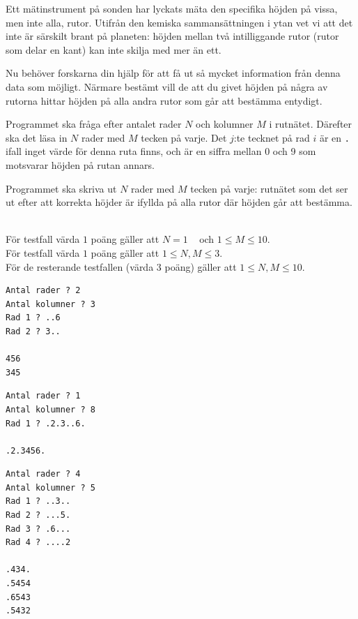 Ett mätinstrument på sonden har lyckats mäta den specifika höjden
på vissa, men inte alla, rutor. Utifrån den kemiska sammansättningen i ytan vet vi att det inte 
är särskilt brant på planeten: höjden mellan två
intilliggande rutor (rutor som delar en kant) kan inte skilja 
med mer än ett. 

Nu behöver forskarna din hjälp för att få ut så mycket information
från denna data som möjligt. Närmare bestämt vill de att du givet höjden
på några av rutorna hittar höjden på alla andra rutor som går att bestämma entydigt.

Programmet ska fråga efter antalet rader $N$ och kolumner $M$ i rutnätet.
Därefter ska det läsa in $N$ rader med $M$ tecken på varje.
Det $j$:te tecknet på rad $i$ är en \texttt{.} ifall
inget värde för denna ruta finns, och är en siffra mellan
0 och 9 som motsvarar höjden på rutan annars.

Programmet ska skriva ut $N$ rader med $M$ tecken på varje:
rutnätet som det ser ut efter att korrekta höjder är ifyllda på alla rutor där höjden går att bestämma.


\\
För testfall värda $1$ poäng gäller att $N=1\;\;\;$ och $1\leq M \leq 10$. \\
För testfall värda $1$ poäng gäller att $1\leq N,M \leq 3 $. \\
För de resterande testfallen (värda $3$ poäng) gäller att $1\leq N,M \leq 10$.

\begin{multicols}{2}
\begin{verbatim}
Antal rader ? 2
Antal kolumner ? 3
Rad 1 ? ..6
Rad 2 ? 3..

456
345
\end{verbatim}

\begin{verbatim}
Antal rader ? 1
Antal kolumner ? 8
Rad 1 ? .2.3..6.

.2.3456.
\end{verbatim}

\vfill\columnbreak

\begin{verbatim}
Antal rader ? 4
Antal kolumner ? 5
Rad 1 ? ..3..
Rad 2 ? ...5.
Rad 3 ? .6...
Rad 4 ? ....2

.434.
.5454
.6543
.5432
\end{verbatim}
\end{multicols}
\newpage
{}

